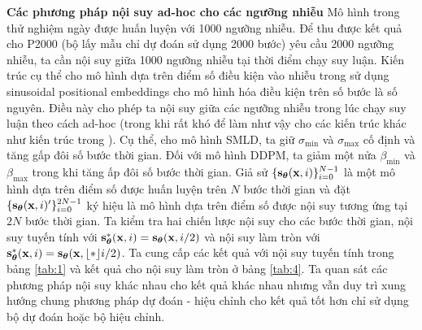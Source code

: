 \documentclass{article} %
\begin{document}
\textbf{Các phương pháp nội suy ad-hoc cho các ngưỡng nhiễu} Mô hình trong thử nghiệm ngày được huấn luyện với 1000 ngưỡng nhiễu.
Để thu được kết quả cho P2000 (bộ lấy mẫu chỉ dự đoán sử dụng 2000 bước) yêu cầu 2000 ngưỡng nhiễu,
ta cần nội suy giữa 1000 ngưỡng nhiễu tại thời điểm chạy suy luận.
Kiến trúc cụ thể cho mô hình dựa trên điểm số điều kiện vào nhiễu trong \citep{ho2020denoising} sử dụng sinusoidal positional embeddings cho mô hình hóa điều kiện trên số bước là số nguyên.
Điều này cho phép ta nội suy giữa các ngưỡng nhiễu trong lúc chạy suy luận theo cách ad-hoc (trong khi rất khó để làm như vậy cho các kiến trúc khác như kiến trúc trong \citep{song2019generative}).
Cụ thể, cho mô hình SMLD, ta giữ $\sigma_{\min}$ và $\sigma_{\max}$ cố định và tăng gấp đôi số bước thời gian.
Đối với mô hình DDPM, ta giảm một nửa $\beta_{\min}$ và $\beta_{\max}$ trong khi tăng ấp đôi số bước thời gian.
Giả sử $\lbrace \bold{s}_{\boldsymbol{\theta}}(\bold{x}, i) \rbrace_{i=0}^{N-1}$ là một mô hình dựa trên điểm số được huấn luyện trên $N$ bước thời gian và đặt $\lbrace \bold{s}_{\boldsymbol{\theta}}(\bold{x}, i)^{\prime} \rbrace_{i=0}^{2N-1}$ ký hiệu là mô hình dựa trên điểm số được nội suy tương ứng tại $2N$ bước thời gian.
Ta kiểm tra hai chiến lược nội suy cho các bước thời gian, nội suy tuyến tính với $\bold{s}_{\boldsymbol{\theta}}^{\ast} (\bold{x}, i)= \bold{s}_{\boldsymbol{\theta}}(\bold{x}, i/2)$ và nội suy làm tròn với $\bold{s}_{\boldsymbol{\theta}}^{\ast} (\bold{x}, i)= \bold{s}_{\boldsymbol{\theta}}(\bold{x}, \lfloor * \rfloor{i/2})$.
Ta cung cấp các kết quả với nội suy tuyến tính trong bảng \ref{tab:1} và kết quả cho nội suy làm tròn ở bảng \ref{tab:4}.
Ta quan sát các phương pháp nội suy khác nhau cho kết quả khác nhau nhưng vẫn duy trì xung hướng chung phương pháp dự đoán - hiệu chỉnh cho kết quả tốt hơn chỉ sử dụng bộ dự đoán hoặc bộ hiệu chỉnh.
\end{document}
